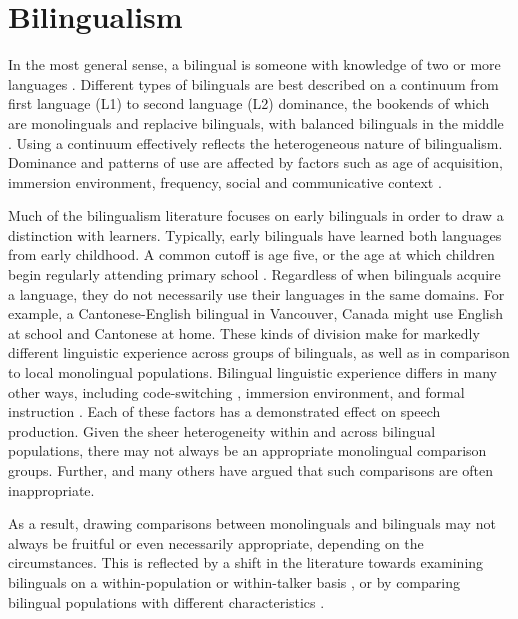 \section{Bilingualism}\label{ch1:sec:bilingualism}

In the most general sense, a bilingual is someone with knowledge of two or more languages \citep{grosjean_1989_bilingual}. Different types of bilinguals are best described on a continuum from first language (L1) to second language (L2) dominance, the bookends of which are monolinguals and replacive bilinguals, with balanced bilinguals in the middle \citep{gertken_2014_blp}. Using a continuum effectively reflects the heterogeneous nature of bilingualism. Dominance and patterns of use are affected by factors such as age of acquisition, immersion environment, frequency, social and communicative context \citep{gertken_2014_blp}. 

Much of the bilingualism literature focuses on early bilinguals in order to draw a distinction with learners. Typically, early bilinguals have learned both languages from early childhood. A common cutoff is age five, or the age at which children begin regularly attending primary school \citep{amengual_2017_type}. Regardless of when bilinguals acquire a language, they do not necessarily use their languages in the same domains. For example, a Cantonese-English bilingual in Vancouver, Canada might use English at school and Cantonese at home. These kinds of division make for markedly different linguistic experience across groups of bilinguals, as well as in comparison to local monolingual populations. Bilingual linguistic experience differs in many other ways, including code-switching \citep{fricke_2016_dimensions}, immersion environment, and formal instruction \citep{fricke_2019_bilingualism}. Each of these factors has a demonstrated effect on speech production. Given the sheer heterogeneity within and across bilingual populations, there may not always be an appropriate monolingual comparison groups. Further, \citet{grosjean_1989_bilingual} and many others have argued that such comparisons are often inappropriate. 

As a result, drawing comparisons between monolinguals and bilinguals may not always be fruitful or even necessarily appropriate, depending on the circumstances. This is reflected by a shift in the literature towards examining bilinguals on a within-population \citep[e.g.,][]{chan_2020_lexically} or within-talker basis \citep[e.g.,][]{simonet_2019_convergence}, or by comparing bilingual populations with different characteristics \citep[e.g.,][]{brown_2009_phonological}. 

